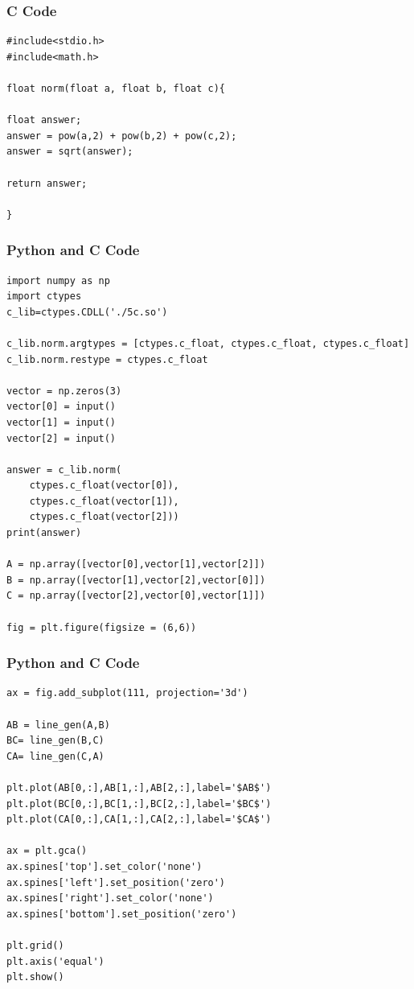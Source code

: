 \documentclass{beamer}
\begin{document}
\begin{frame}[fragile]
\frametitle{C Code}
\begin{lstlisting}
#include<stdio.h>
#include<math.h>

float norm(float a, float b, float c){

float answer;
answer = pow(a,2) + pow(b,2) + pow(c,2);
answer = sqrt(answer);

return answer;

}
\end{lstlisting}
\end{frame}


\begin{frame}[fragile]
\frametitle{Python and C Code}
\begin{lstlisting}
import numpy as np
import ctypes
c_lib=ctypes.CDLL('./5c.so')

c_lib.norm.argtypes = [ctypes.c_float, ctypes.c_float, ctypes.c_float]
c_lib.norm.restype = ctypes.c_float

vector = np.zeros(3)
vector[0] = input()
vector[1] = input()
vector[2] = input()

answer = c_lib.norm(
    ctypes.c_float(vector[0]),
    ctypes.c_float(vector[1]), 
    ctypes.c_float(vector[2]))
print(answer)

A = np.array([vector[0],vector[1],vector[2]])
B = np.array([vector[1],vector[2],vector[0]])
C = np.array([vector[2],vector[0],vector[1]])

fig = plt.figure(figsize = (6,6))

\end{lstlisting}
\end{frame}

\begin{frame}[fragile]
\frametitle{Python and C Code}
\begin{lstlisting}
ax = fig.add_subplot(111, projection='3d')

AB = line_gen(A,B)
BC= line_gen(B,C)
CA= line_gen(C,A)

plt.plot(AB[0,:],AB[1,:],AB[2,:],label='$AB$')
plt.plot(BC[0,:],BC[1,:],BC[2,:],label='$BC$')
plt.plot(CA[0,:],CA[1,:],CA[2,:],label='$CA$')

ax = plt.gca()
ax.spines['top'].set_color('none')
ax.spines['left'].set_position('zero')
ax.spines['right'].set_color('none')
ax.spines['bottom'].set_position('zero')

plt.grid()
plt.axis('equal')
plt.show()

\end{lstlisting}
\end{frame}
\end{document}
